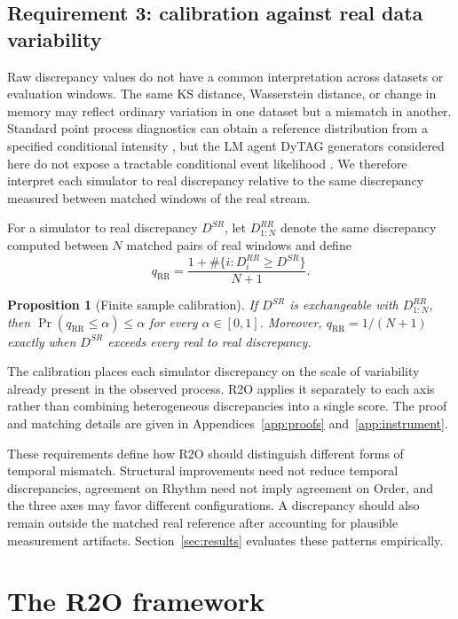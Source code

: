 \documentclass{article}
\newtheorem{proposition}{Proposition}
\begin{document}
\subsection{Requirement 3: calibration against real data variability}

Raw discrepancy values do not have a common interpretation across datasets or
evaluation windows. The same KS distance, Wasserstein distance, or change in
memory may reflect ordinary variation in one dataset but a mismatch
in another. Standard point process diagnostics can obtain a reference
distribution from a specified conditional intensity
\citep{ogata1988statistical,brown2002timerescaling}, but the LM agent DyTAG
generators considered here do not expose a tractable conditional event
likelihood \citep{ji2025gag,peng2025gdgb,ji2026graphia}. We therefore
interpret each simulator to real discrepancy relative to the same discrepancy
measured between matched windows of the real stream.

For a simulator to real discrepancy $D^{SR}$, let $D^{RR}_{1:N}$ denote the
same discrepancy computed between $N$ matched pairs of real windows and define
\[
q_{\mathrm{RR}}=
\frac{1+\#\{i:D^{RR}_i\ge D^{SR}\}}{N+1}.
\]

\begin{proposition}[Finite sample calibration]
\label{prop:calibration}
If $D^{SR}$ is exchangeable with $D^{RR}_{1:N}$, then
$\Pr(q_{\mathrm{RR}}\le\alpha)\le\alpha$ for every $\alpha\in[0,1]$.
Moreover, $q_{\mathrm{RR}}=1/(N+1)$ exactly when $D^{SR}$ exceeds every real
to real discrepancy.
\end{proposition}

The calibration places each simulator discrepancy on the scale of variability
already present in the observed process. R2O applies it separately to each
axis rather than combining heterogeneous discrepancies into a single score.
The proof and matching details are given in Appendices~\ref{app:proofs}
and~\ref{app:instrument}.

These requirements define how R2O should distinguish different forms
of temporal mismatch. Structural improvements need not reduce temporal
discrepancies, agreement on Rhythm need not imply agreement on Order, and the
three axes may favor different configurations. A discrepancy should also remain
outside the matched real reference after accounting for plausible measurement
artifacts. Section~\ref{sec:results} evaluates these patterns empirically.

\section{The R2O framework}
\label{sec:r2o}
\end{document}
